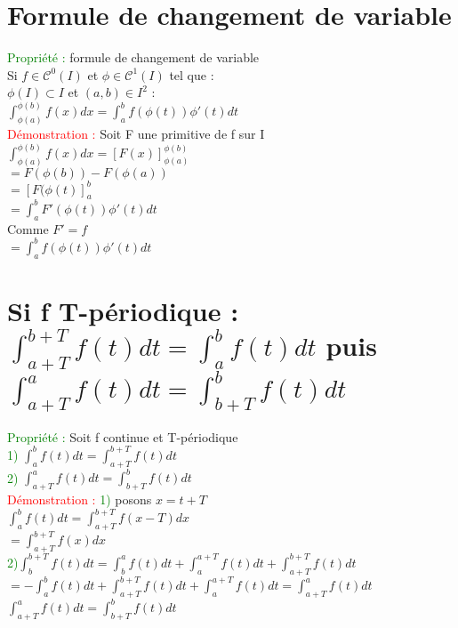 \documentclass{article}
\begin{document}
	\section{Formule de changement de variable}
	\textcolor{green}{Propriété :} formule de changement de variable \\ 
	Si $f \in \mathcal{C}^0(I)$ et $\phi \in \mathcal{C}^1(I)$ tel que : \\ 
	$\phi(I) \subset I$ et $(a,b) \in I^2$ : \\ 
	$\int_{\phi(a)}^{\phi(b)}f(x)dx=\int_a^bf(\phi(t)) \phi'(t)dt$ \\ 
	\textcolor{red}{Démonstration :} Soit F une primitive de f sur I \\ 
	$\int_{\phi(a)}^{\phi(b)}f(x)dx=[F(x)]^{\phi(b)}_{\phi(a)}$ \\ 
	$= F(\phi(b)) -F(\phi(a))$ \\ 
	$= [F(\phi(t)]_a^b$ \\ 
	$= \int_a^bF'(\phi(t))\phi'(t)dt$ \\ 
	Comme $F'=f$ \\ 
	$= \int_a^b f(\phi(t)) \phi'(t)dt$ \\
	\section{Si f T-périodique : $\int_{a+T}^{b+T}f(t)dt=\int_{a}^{b}f(t)dt$ puis $\int_{a+T}^{a}f(t)dt=\int_{b+T}^{b}f(t)dt$}
\textcolor{green}{Propriété :} Soit f continue et T-périodique \\
	\textcolor{green}{1)} $\int_a^bf(t)dt=\int_{a+T}^{b+T}f(t)dt$ \\ 
	\textcolor{green}{2)} $\int_{a+T}^{a}f(t)dt=\int_{b+T}^{b}f(t)dt$ \\
	\textcolor{red}{Démonstration :} \textcolor{green}{1)} posons $x=t+T$ \\ 
	$\int_a^bf(t)dt=\int_{a+T}^{b+T}f(x-T)dx$ \\ 
	$=\int^{b+T}_{a+T}{f(x)dx}$ \\
    \textcolor{green}{2)}$\int_b^{b+T}f(t)dt=\int_{b}^{a}f(t)dt+\int_{a}^{a+T}f(t)dt+\int_{a+T}^{b+T}f(t)dt$ \\ $= - \int_a^bf(t)dt + \int_{a+T}^{b+T}f(t)dt + \int_{a}^{a+T} f(t)dt=\int_{a+T}^{a}f(t)dt$ \\
    $\int_{a+T}^{a}f(t)dt=\int_{b+T}^{b}f(t)dt$ 
\end{document}
